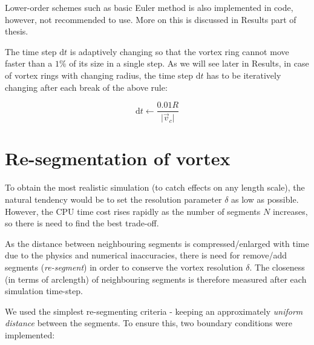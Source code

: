 Lower-order schemes such as basic Euler method is also implemented in code, however, not recommended to use. More on this is discussed in Results part of thesis.

The time step $\text{d}t$ is adaptively changing so that the vortex ring cannot move faster than a $1\%$ of its size in a single step. As we will see later in Results, in case of vortex rings with changing radius, the time step $\text{d}t$ has to be iteratively changing after each break of the above rule:

\begin{equation}
\text{d}t \leftarrow \frac{0.01 R}{\vert \vec{v}_c \vert}
\label{adaptive_dt}
\end{equation}

\section{Re-segmentation of vortex}

To obtain the most realistic simulation (to catch effects on any length scale), the natural tendency would be to set the resolution parameter $\delta$ as low as possible. However, the CPU time cost rises rapidly as the number of segments $N$ increases, so there is need to find the best trade-off.

As the distance between neighbouring segments is compressed/enlarged with time due to the physics and numerical inaccuracies, there is need for remove/add segments (\textit{re-segment}) in order to conserve the vortex resolution $\delta$. The closeness (in terms of arclength) of neighbouring segments is therefore measured after each simulation time-step.

We used the simplest re-segmenting criteria - keeping an approximately \textit{uniform distance} between the segments. To ensure this, two boundary conditions were implemented:

